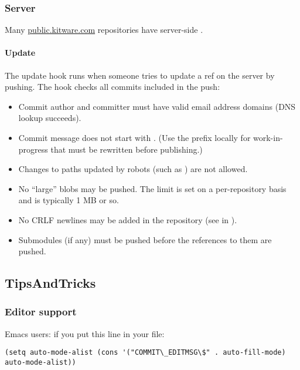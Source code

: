 \subsubsection{Server}
\label{subsubsec:Server}

Many \url{public.kitware.com} repositories have server-side .


\paragraph{Update}
\label{par:Update}

The update hook runs when someone tries to update a ref on the server by
pushing. The hook checks all commits included in the push:
\begin{itemize}
\item Commit author and committer must have valid email address domains (DNS
lookup succeeds).
\item Commit message does not start with . (Use the prefix locally
for work-in-progress that must be rewritten before publishing.)
\item Changes to paths updated by robots (such as ) are
not allowed.
\item No ``large'' blobs may be pushed. The limit is set on a per-repository
basis and is typically 1 MB or so.
\item No CRLF newlines may be added in the repository (see 
in ).
\item Submodules (if any) must be pushed before the references to them are
pushed.
\end{itemize}

\subsection{TipsAndTricks}
\label{subsec:TipsAndTricks}

\subsubsection{Editor support}
\label{subsubsec:EditorSupport}

Emacs users: if you put this line in your  file:

\begin{verbatim}
(setq auto-mode-alist (cons '("COMMIT\_EDITMSG\$" . auto-fill-mode) auto-mode-alist))
\end{verbatim}

